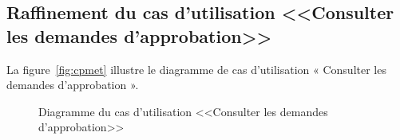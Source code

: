\subsection{Raffinement du cas d'utilisation <<Consulter les demandes d'approbation>>}
La figure~\ref{fig:cpmet} illustre le diagramme de cas d'utilisation « Consulter les demandes d'approbation ».
\begin{figure}[h]
     \centering
     \caption{Diagramme du cas d'utilisation <<Consulter les demandes d'approbation>>}
     \label{fig:cdapp}
\end{figure}\\
\newpage
